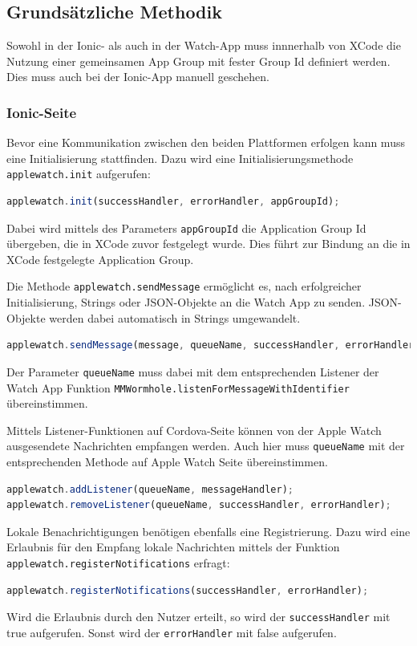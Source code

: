\subsection{Grundsätzliche Methodik} 
%
Sowohl in der Ionic- als auch in der Watch-App muss innnerhalb von XCode die Nutzung einer gemeinsamen App Group mit fester Group Id definiert werden. Dies muss auch bei der Ionic-App manuell geschehen.
%
\subsubsection{Ionic-Seite}
%
Bevor eine Kommunikation zwischen den beiden Plattformen erfolgen kann muss eine Initialisierung stattfinden. Dazu wird eine Initialisierungsmethode \texttt{applewatch.init} aufgerufen:
\begin{lstlisting}[language=JavaScript]
applewatch.init(successHandler, errorHandler, appGroupId);
\end{lstlisting}
Dabei wird mittels des Parameters \texttt{appGroupId} die Application Group Id übergeben, die in XCode zuvor festgelegt wurde. Dies führt zur Bindung an die in XCode festgelegte Application Group.

Die Methode \texttt{applewatch.sendMessage} ermöglicht es, nach erfolgreicher Initialisierung, Strings oder JSON-Objekte an die Watch App zu senden. JSON-Objekte werden dabei automatisch in Strings umgewandelt. 

\begin{lstlisting}[language=JavaScript]
applewatch.sendMessage(message, queueName, successHandler, errorHandler);
\end{lstlisting}
Der Parameter \texttt{queueName} muss dabei mit dem entsprechenden Listener der Watch App Funktion \texttt{MMWormhole.listenForMessageWithIdentifier} übereinstimmen. 

Mittels Listener-Funktionen auf Cordova-Seite können von der Apple Watch ausgesendete Nachrichten empfangen werden. Auch hier muss \texttt{queueName} mit der entsprechenden Methode auf Apple Watch Seite übereinstimmen.
\begin{lstlisting}[language=JavaScript]
applewatch.addListener(queueName, messageHandler);
applewatch.removeListener(queueName, successHandler, errorHandler);
\end{lstlisting}

Lokale Benachrichtigungen benötigen ebenfalls eine Registrierung. Dazu wird eine Erlaubnis für den Empfang lokale Nachrichten mittels der Funktion \texttt{applewatch.registerNotifications} erfragt:
\begin{lstlisting}[language=JavaScript]
applewatch.registerNotifications(successHandler, errorHandler);
\end{lstlisting}
Wird die Erlaubnis durch den Nutzer erteilt, so wird der \texttt{successHandler} mit true aufgerufen. Sonst wird der \texttt{errorHandler} mit false aufgerufen.

